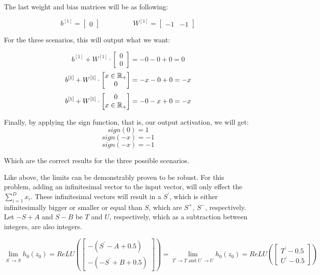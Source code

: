 \documentclass[12pt]{article}
\begin{document}
\begin{itemize}
        The last weight and bias matrices will be as following:

        \[
            b^{[1]} = \begin{bmatrix}
                0
            \end{bmatrix}
            \hspace{2cm}
            W^{[1]} = \begin{bmatrix}
                -1 & -1
            \end{bmatrix}
        \]

        For the three scenarios, this will output what we want:

        \[
            b^{[1]}+W^{[1]}\cdot
            \begin{bmatrix}
                0 \\
                0
            \end{bmatrix}
            =
            -0 -0 + 0 = 0
        \]
        \[
            b^{[1]}+W^{[1]}\cdot\begin{bmatrix}x\in\mathbb{R}_{+}\\0\end{bmatrix}
            =
            - x - 0 + 0 = -x
        \]
        \[
            b^{[1]}+W^{[1]}\cdot\begin{bmatrix}0\\x\in\mathbb{R}_{+}\end{bmatrix}
            =
            - 0 - x + 0 = -x
        \]

        Finally, by applying the sign function, that is, our output activation, we will get:
        \[
            sign(0) = 1
        \]
        \[
            sign(-x) = -1
        \]
        \[
            sign(-x) = -1
        \]

        Which are the correct results for the three possible scenarios.

        Like above, the limits can be demonstrably proven to be robust. For this problem, adding an infinitesimal vector to the input vector, will only effect the $\sum_{i=1}^{D} x_i$. These infinitesimal vectors will result in a $S^{'}$, which is either infinitesimally bigger or smaller or equal than $S$, which are $S^{+}$, $S^{-}$, respectively. Let $-S+A$ and $S-B$ be $T$ and $U$, respectively, which as a subtraction between integers, are also integers.

        \[
            \lim_{S^{'}\to S}  h_0(z_0) = 
            ReLU(
            \begin{bmatrix}
                - (S^{'} - A + 0.5) \\
                -(-S^{'} + B + 0.5) 
            \end{bmatrix}
            )
            = \lim_{T^{'}\to T \text{ and } U^{'}\to U}  h_0(z_0) =
            ReLU(
            \begin{bmatrix}
                T^{'} - 0.5 \\
                U^{'} - 0.5
            \end{bmatrix}
            )
        \]


\end{itemize}
\end{document}

